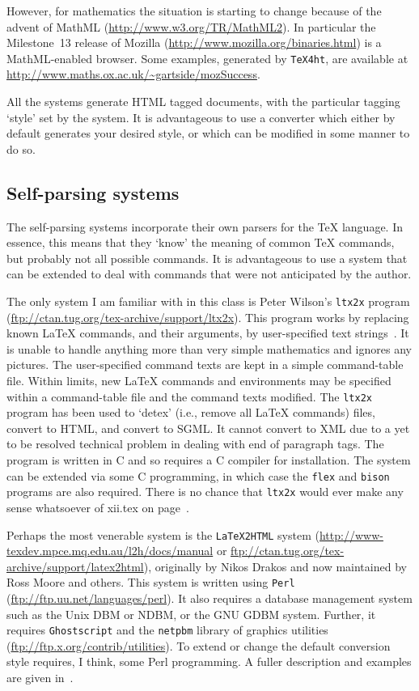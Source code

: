 \documentclass[11pt]{article}
\newcommand{\file}[1]{\textsf{#1}}
\newcommand{\program}[1]{\texttt{#1}}
\newcommand{\tex}{TeX}
\newcommand{\latex}{LaTeX}
\begin{document}
    However, for mathematics the situation is starting to change
because of the advent of MathML (\url{http://www.w3.org/TR/MathML2}). 
In particular the Milestone~13 release
of Mozilla (\url{http://www.mozilla.org/binaries.html})
is a MathML-enabled browser. Some examples, generated by \program{TeX4ht},
are available at \url{http://www.maths.ox.ac.uk/~gartside/mozSuccess}.

    All the systems generate HTML tagged documents, with the particular tagging
`style' set by the system. It is advantageous to use a converter which either by
default generates your desired style, or which can be modified in some manner
to do so.

\subsection{Self-parsing systems}

    The self-parsing systems incorporate their own parsers for the \tex{} 
language. In essence, this means that they `know' the meaning of common
\tex{} commands, but probably not all possible commands. 
It is advantageous to use a system that can be
extended to deal with commands that were not anticipated by the author.

    The only system I am familiar with in this class is Peter Wilson's
\program{ltx2x} program (\url{ftp://ctan.tug.org/tex-archive/support/ltx2x}). 
This program works by replacing known \latex{}
commands, and their arguments, by user-specified text strings~\cite{PRW96h}. 
It is unable
to handle anything more than very simple mathematics and ignores any pictures.
The user-specified command texts are kept in a simple command-table file. 
Within limits, new \latex{} commands and environments may be specified
within a command-table file and the command texts modified. The \program{ltx2x}
program has been used to `detex' (i.e., remove all \latex{} commands) files,
convert to HTML, and convert to SGML. It cannot convert to XML due to a
yet to be resolved technical problem in dealing with end of paragraph tags.
The program is written in C and so requires a C compiler for installation.
The system can be extended via some C programming, in which case 
the \program{flex} and \program{bison} programs are also required.
There is no chance that \program{ltx2x} would ever make any sense whatsoever
of \file{xii.tex} on page~\pageref{code:xii}.

    Perhaps the most venerable system is the \program{LaTeX2HTML} 
system (\url{http://www-texdev.mpce.mq.edu.au/l2h/docs/manual}
or \url{ftp://ctan.tug.org/tex-archive/support/latex2html}), originally
by Nikos Drakos and now maintained by Ross Moore and others. This system
is written using \program{Perl} (\url{ftp://ftp.uu.net/languages/perl}).
It also requires a database management system such as the Unix DBM or NDBM,
or the GNU GDBM system. Further, it requires \program{Ghostscript} and
the \program{netpbm} library of graphics utilities 
(\url{ftp://ftp.x.org/contrib/utilities}). To extend or change the default
conversion style requires, I think, some Perl programming. A fuller description
and examples are given in~\cite{GOOSSENS99}.
\end{document}
